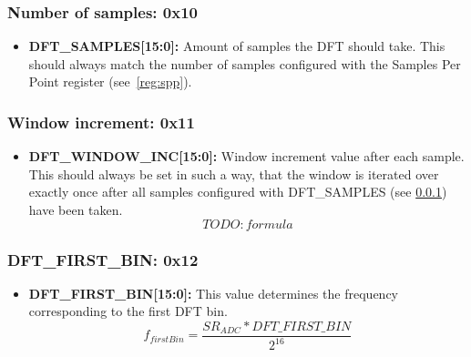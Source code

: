 \documentclass{article}
\newcommand{\bitrect}[2]{
  \begin{pgfonlayer}{foreground}
    \draw [thick] (0,0) rectangle (#1,1);
    \pgfmathsetmacro\result{#1-1}
    \foreach \x in {1,...,\result}
      \draw [thick] (\x,1) -- (\x, 0.8);
  \end{pgfonlayer}
  \bitlabels{#1}{#2}
}
\newcommand{\rwbits}[3]{
  \draw [thick] (#1,0) rectangle ++(#2,1) node[pos=0.5]{#3};
  \pgfmathsetmacro\start{#1+0.5}
  \pgfmathsetmacro\finish{#1+#2-0.5}
}
\newcommand{\bitlabels}[2]{
  \foreach \bit in {1,...,#1}{
     \pgfmathsetmacro\result{#2}
     \node [above] at (\bit-0.5, 1) {\pgfmathprintnumber{\result}};
   }
}
\begin{document}
\subsubsection{Number of samples: 0x10}
\label{reg:dft-nsamples}
\begin{center}
\end{center}
\begin{itemize}
\item \textbf{DFT\_SAMPLES[15:0]:} Amount of samples the DFT should take. This should always match the number of samples configured with the Samples Per Point register (see~\ref{reg:spp}).
\end{itemize}

\subsubsection{Window increment: 0x11}
\begin{center}
\end{center}
\begin{itemize}
\item \textbf{DFT\_WINDOW\_INC[15:0]:} Window increment value after each sample. This should always be set in such a way, that the window is iterated over exactly once after all samples configured with DFT\_SAMPLES (see \ref{reg:dft-nsamples}) have been taken.
$$ TODO: formula $$
\end{itemize}

\subsubsection{DFT\_FIRST\_BIN: 0x12}
\begin{center}
\end{center}
\begin{itemize}
\item \textbf{DFT\_FIRST\_BIN[15:0]:} This value determines the frequency corresponding to the first DFT bin.
$$ f_{firstBin} =  \frac{SR_{ADC} * DFT\_FIRST\_BIN}{2^{16}}$$
\end{itemize}
\end{document}

